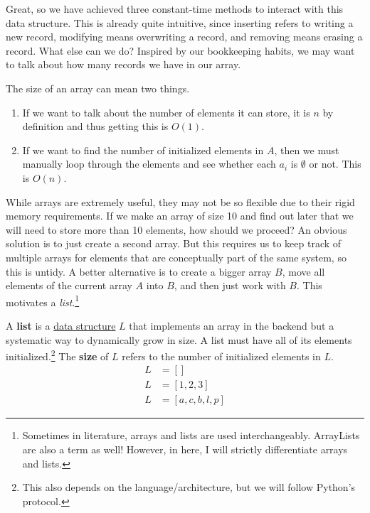   Great, so we have achieved three constant-time methods to interact with this data structure. This is already quite intuitive, since inserting refers to writing a new record, modifying means overwriting a record, and removing means erasing a record. What else can we do? Inspired by our bookkeeping habits, we may want to talk about how many records we have in our array. 

  \begin{algo}
    The size of an array can mean two things. 
    \begin{enumerate}
      \item If we want to talk about the number of elements it can store, it is $n$ by definition and thus getting this is $O(1)$. 
      \item If we want to find the number of initialized elements in $A$, then we must manually loop through the elements and see whether each $a_i$ is $\emptyset$ or not. This is $O(n)$. 
    \end{enumerate} 
  \end{algo} 

  While arrays are extremely useful, they may not be so flexible due to their rigid memory requirements. If we make an array of size 10 and find out later that we will need to store more than 10 elements, how should we proceed? An obvious solution is to just create a second array. But this requires us to keep track of multiple arrays for elements that are conceptually part of the same system, so this is untidy. A better alternative is to create a bigger array $B$, move all elements of the current array $A$ into $B$, and then just work with $B$. This motivates a \textit{list}.\footnote{Sometimes in literature, arrays and lists are used interchangeably. ArrayLists are also a term as well! However, in here, I will strictly differentiate arrays and lists.} 

  \begin{definition}[List]
    \label{def:list}
    A \textbf{list} is a \hyperref[def:data-structure]{data structure} $L$ that implements an array in the backend but a systematic way to dynamically grow in size. A list must have all of its elements initialized.\footnote{This also depends on the language/architecture, but we will follow Python's protocol.} The \textbf{size} of $L$ refers to the number of initialized elements in $L$.
    \begin{align}
      L & = [] \\
      L & = [1, 2, 3] \\
      L & = [a, c, b, l, p]
    \end{align}
  \end{definition} 

